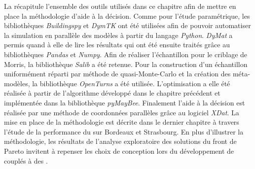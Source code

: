 La  récapitule l’ensemble des outils utilisés dans ce chapitre
afin de mettre en place la méthodologie d’aide à la décision. Comme pour l’étude
paramétrique, les bibliothèques \textit{Buildingspy} et \textit{DymTK} ont été utilisées
afin de pouvoir automatiser la simulation en parallèle des modèles à partir du langage
\textit{Python}. \textit{DyMat} a permis quand à elle de lire les résultats qui ont été
ensuite traités grâce au bibliothèques \textit{Pandas} et \textit{Numpy}. Afin de réaliser
l’échantillon pour le criblage de Morris, la bibliothèque \textit{Salib} a été retenue.
Pour la construction d’un échantillon uniformément réparti par méthode de quasi-Monte-Carlo
et la création des méta-modèles, la bibliothèque \textit{OpenTurns} a été utilisée.
L’optimisation a elle été réalisée à partir de l’algorithme développé dans le chapitre
précédent et implémentée dans la bibliothèque \textit{pyMayBee}. Finalement l’aide à la
décision est réalisée par une méthode de coordonnées parallèles grâce au logiciel
\textit{XDat}.
La mise en place de la méthodologie est décrite dans le dernier chapitre à travers l’étude
de la performance du  sur Bordeaux et Strasbourg. En plus d’illustrer la
méthodologie, les résultats de l’analyse exploratoire des solutions du front de Pareto
invitent à repenser les choix de conception lors du développement de  couplés à
des .
